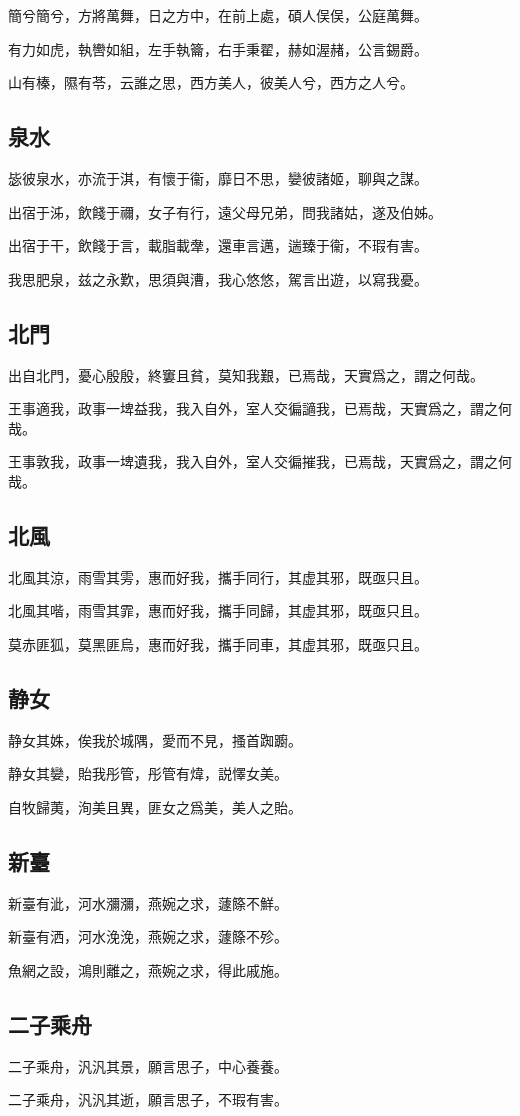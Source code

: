 簡兮簡兮，方將萬舞，日之方中，在前上處，碩人俣俣，公庭萬舞。

有力如虎，執轡如組，左手執籥，右手秉翟，赫如渥赭，公言錫爵。

山有榛，隰有苓，云誰之思，西方美人，彼美人兮，西方之人兮。

\subsection[泉水]{泉水}

毖彼泉水，亦流于淇，有懷于衞，靡日不思，孌彼諸姬，聊與之謀。

出宿于泲，飲餞于禰，女子有行，遠父母兄弟，問我諸姑，遂及伯姊。

出宿于干，飲餞于言，載脂載舝，還車言邁，遄臻于衞，不瑕有害。

我思肥泉，兹之永歎，思須與漕，我心悠悠，駕言出遊，以寫我憂。

\subsection[北門]{北門}

出自北門，憂心殷殷，終窶且貧，莫知我艱，已焉哉，天實爲之，謂之何哉。

王事適我，政事一埤益我，我入自外，室人交徧讁我，已焉哉，天實爲之，謂之何哉。

王事敦我，政事一埤遺我，我入自外，室人交徧摧我，已焉哉，天實爲之，謂之何哉。

\subsection[北風]{北風}

北風其涼，雨雪其雱，惠而好我，攜手同行，其虚其邪，既亟只且。

北風其喈，雨雪其霏，惠而好我，攜手同歸，其虚其邪，既亟只且。

莫赤匪狐，莫黑匪烏，惠而好我，攜手同車，其虚其邪，既亟只且。

\subsection[静女]{静女}

静女其姝，俟我於城隅，愛而不見，搔首踟躕。

静女其孌，貽我彤管，彤管有煒，説懌女美。

自牧歸荑，洵美且異，匪女之爲美，美人之貽。

\subsection[新臺]{新臺}

新臺有泚，河水瀰瀰，燕婉之求，蘧篨不鮮。

新臺有洒，河水浼浼，燕婉之求，蘧篨不殄。

魚網之設，鴻則離之，燕婉之求，得此戚施。

\subsection[二子乘舟]{二子乘舟}

二子乘舟，汎汎其景，願言思子，中心養養。

二子乘舟，汎汎其逝，願言思子，不瑕有害。
